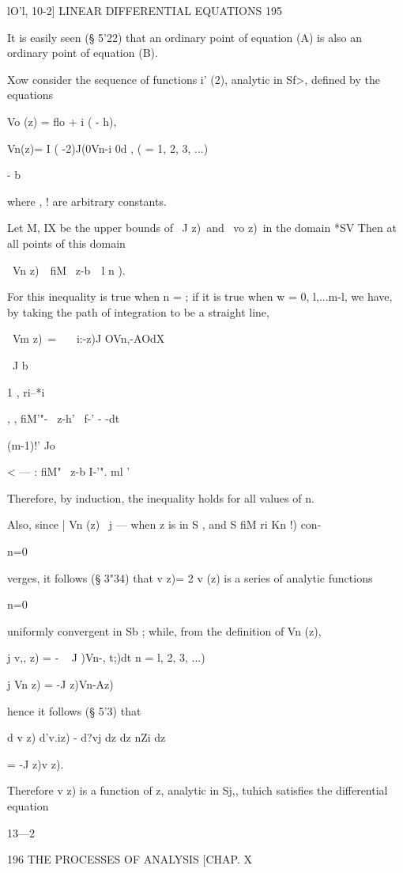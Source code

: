 lO'l, 10-2] LINEAR DIFFERENTIAL EQUATIONS 195

It is easily seen (§ 5'22) that an ordinary point of equation (A) is
also an ordinary point of equation (B).

Xow consider the sequence of functions i' (2), analytic in Sf>,
defined by the equations

Vo (z) = flo + i ( - h),



Vn(z)= I ( -2)J(0Vn-i 0d , ( = 1, 2, 3, ...)

- b

where , ! are arbitrary constants.

Let M, IX be the upper bounds of \ J z)\ and \ vo z)\ in the domain
*SV Then at all points of this domain

\ Vn z)\ \ fiM \ z-b\ \ l n ).

For this inequality is true when n = ; if it is true when w = 0,
l,...m-l, we have, by taking the path of integration to be a straight
line,

\ Vm z)\ = \ \ \ i:-z)J OVn,-AOdX

\ J b

1 , ri--*i

  , , fiM'"- \ z-h' \ f-' - -dt

(m-1)!' Jo

< — : fiM" \ z-b I-'". ml '

Therefore, by induction, the inequality holds for all values of n.

Also, since | Vn (z) \ j — when z is in S , and S fiM ri Kn !) con-

    n=0

verges, it follows (§ 3"34) that v z)= 2 v (z) is a series of analytic
functions

n=0

uniformly convergent in Sb ; while, from the definition of Vn (z),

j v,, z) = - ~ J \;)Vn-, t;)dt n = l, 2, 3, ...)

j Vn z) = -J z)Vn-Az)\

hence it follows (§ 5'3) that

d v z) d'v.iz) - d?vj dz dz nZi dz

= -J z)v z).

Therefore v z) is a function of z, analytic in Sj,, tuhich satisfies
the differential equation

13—2



196 THE PROCESSES OF ANALYSIS [CHAP. X

